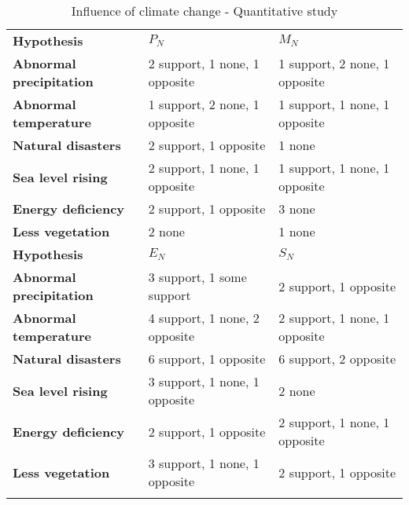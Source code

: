 \documentclass{mcmthesis}
\newlength\savedwidth
\newcommand\whline{\noalign{\global\savedwidth\arrayrulewidth
                            \global\arrayrulewidth 1.2pt}%
                   \hline
                   \noalign{\global\arrayrulewidth\savedwidth}}
\newlength\savewidth
\newcommand\shline{\noalign{\global\savewidth\arrayrulewidth
                            \global\arrayrulewidth 1.2pt}%
                   \hline
                   \noalign{\global\arrayrulewidth\savewidth}}
\begin{document}
\begin{table}[htbp]
	\renewcommand\arraystretch{1.5}
	\footnotesize
	\centering
	\begin{tabular}{m{3.8cm}<{\centering}|m{4.8cm}<{\centering}|m{4.8cm}<{\centering}}
		\whline
		\textbf{Hypothesis}&\textbf{$P_N$}&\textbf{$M_N$}\\
		\whline
		\textbf{Abnormal precipitation}& 2 support, 1 none, 1 opposite &1 support, 2 none, 1 opposite\\
		
		\textbf{Abnormal temperature}&1 support, 2 none, 1 opposite&1 support, 1 none, 1 opposite\\
		
		\textbf{Natural disasters}&2 support, 1 opposite&1 none\\
		
		\textbf{Sea level rising}&2 support, 1 none, 1 opposite&1 support, 1 none, 1 opposite\\
		
		\textbf{Energy deficiency}&2 support, 1 opposite&3 none\\
		
		\textbf{Less vegetation}&2 none&1 none\\
		
		\shline
		\textbf{Hypothesis}&\textbf{$E_N$}&\textbf{$S_N$}\\
		\whline
		\textbf{Abnormal precipitation}& 3 support, 1 some support &2 support, 1 opposite\\
		
		\textbf{Abnormal temperature}&4 support, 1 none, 2 opposite&2 support, 1 none, 1 opposite\\
		
		\textbf{Natural disasters}&6 support, 1 opposite&6 support, 2 opposite\\
		
		\textbf{Sea level rising}&3 support, 1 none, 1 opposite&2 none\\
		
		\textbf{Energy deficiency}&2 support, 1 opposite&2 support, 1 none, 1 opposite\\
		
		\textbf{Less vegetation}&3 support, 1 none, 1 opposite&2 support, 1 opposite\\
		\shline
	\end{tabular}
	\caption{Influence of climate change - Quantitative study}\label{tab:Influence of climate change - Quantitative study}
\end{table}
\end{document}
